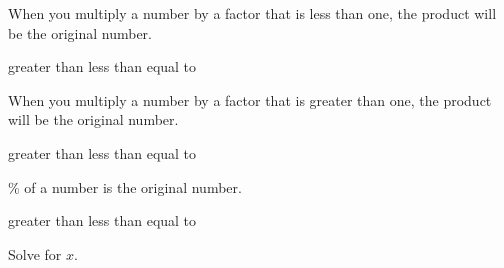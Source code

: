 \documentclass[12pt,letter]{exam}
\begin{document}
\begin{questions}
\begin{solution}
    \end{solution}
    \question When you multiply a number by a factor that is less than one, the product will be \fillin the original number.

    \begin{oneparcheckboxes}
        \choice greater than
        \CorrectChoice less than
        \choice equal to
    \end{oneparcheckboxes}
    \question When you multiply a number by a factor that is greater than one, the product will be \fillin the original number.

    \begin{oneparcheckboxes}
        \CorrectChoice greater than
        \choice less than
        \choice equal to
    \end{oneparcheckboxes}
    \% of a number is \fillin the original number.

    \begin{oneparcheckboxes}
        \choice greater than
        \choice less than
        \CorrectChoice equal to
    \end{oneparcheckboxes}
    \question Solve for $x$.
    \begin{parts}

\end{parts}
\end{questions}
\end{document}

